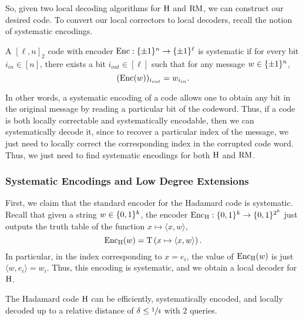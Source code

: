\documentclass[11pt]{article}
\begin{document}
So, given two local decoding algorithms for $\mathrm{H}$ and $\mathrm{RM}$, we can construct our desired code. To convert our local correctors to local decoders, recall the notion of systematic encodings.

\begin{definition}{2.4}
    A $[\ell, n]_2$  code with encoder $\mathrm{Enc} : \{\pm 1\}^{n} \rightarrow \{\pm 1\}^{\ell}$ is systematic if for every bit $i_{in} \in [n]$, there exists a bit $i_{out} \in [\ell]$ such that for any message $w \in \{\pm 1\}^n$, 
    \begin{equation*}
        (\mathrm{Enc}(w))_{i_{out}} = w_{i_{in}}.
    \end{equation*}
\end{definition}

In other words, a systematic encoding of a code allows one to obtain any bit in the original message by reading a particular bit of the codeword. Thus, if a code is both locally correctable and systematically encodable, then we can systematically decode it, since to recover a particular index of the message, we just need to locally correct the corresponding index in the corrupted code word. Thus, we just need to find systematic encodings for both $\mathrm{H}$ and $\mathrm{RM}$.

\subsubsection{Systematic Encodings and Low Degree Extensions}

First, we claim that the standard encoder for the Hadamard code is systematic. Recall that given a string $w \in \{0, 1\}^k$, the encoder $\mathrm{Enc}_{\mathrm{H}} : \{0, 1\}^k \rightarrow \{0, 1\}^{2^k}$ just outputs the truth table of the function $x \mapsto \langle x, w \rangle$,
\begin{equation*}
    \mathrm{Enc}_{\mathrm{H}} (w) = \mathrm{T}\left(x \mapsto \langle x, w \rangle\right).
\end{equation*}
In particular, in the index corresponding to $x = e_i$, the value of $\mathrm{Enc}_{\mathrm{H}}(w)$ is just $\langle w, e_i \rangle = w_i$. Thus, this encoding is systematic, and we obtain a local decoder for $\mathrm{H}$.

\begin{claim}{2.4}
    The Hadamard code $\mathrm{H}$ can be efficiently, systematically encoded, and locally decoded up to a relative distance of $\delta \leq \sfrac{1}{4}$ with $2$ queries.
\end{claim}
\end{document}
